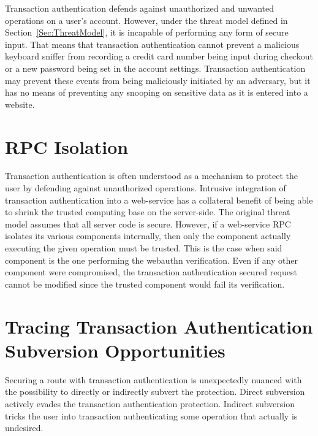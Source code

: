 Transaction authentication defends against unauthorized and unwanted operations on a user's account. However, under the threat model defined in Section~\ref{Sec:ThreatModel}, it is incapable of performing any form of secure input. That means that transaction authentication cannot prevent a malicious keyboard sniffer from recording a credit card number being input during checkout or a new password being set in the account settings. Transaction authentication may prevent these events from being maliciously initiated by an adversary, but it has no means of preventing any snooping on sensitive data as it is entered into a website.

\section{RPC Isolation}

Transaction authentication is often understood as a mechanism to protect the user by defending against unauthorized operations. Intrusive integration of transaction authentication into a web-service has a collateral benefit of being able to shrink the trusted computing base on the server-side. The original threat model assumes that all server code is secure. However, if a web-service RPC isolates its various components internally, then only the component actually executing the given operation must be trusted. This is the case when said component is the one performing the webauthn verification. Even if any other component were compromised, the transaction authentication secured request cannot be modified since the trusted component would fail its verification.



\section{Tracing Transaction Authentication \newline Subversion Opportunities}

Securing a route with transaction authentication is unexpectedly nuanced with the possibility to directly or indirectly subvert the protection. Direct subversion actively evades the transaction authentication protection. Indirect subversion tricks the user into transaction authenticating some operation that actually is undesired.

